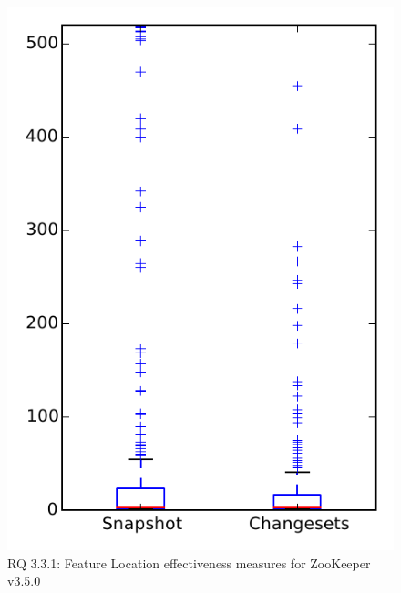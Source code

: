 
\begin{figure}
\centering
\includegraphics[height=0.4\textheight]{figures/flt/rq1_zookeeper}
\caption{RQ 3.3.1: Feature Location effectiveness measures for ZooKeeper v3.5.0}
\label{fig:flt:rq1:zookeeper}
\end{figure}
